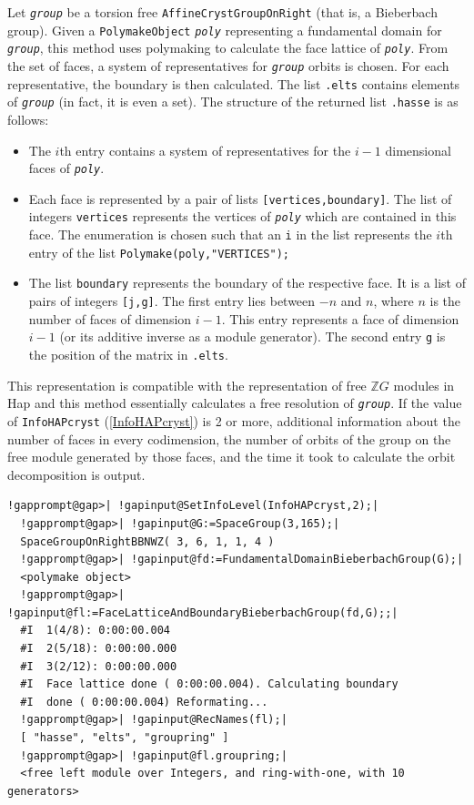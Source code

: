\documentclass[a4paper,11pt]{report}
\begin{document}
{{{ Let \mbox{\texttt{\mdseries\slshape group}} be a torsion free \texttt{AffineCrystGroupOnRight} (that is, a Bieberbach group). Given a \texttt{PolymakeObject} \mbox{\texttt{\mdseries\slshape poly}} representing a fundamental domain for \mbox{\texttt{\mdseries\slshape group}}, this method uses \textsf{polymaking} to calculate the face lattice of \mbox{\texttt{\mdseries\slshape poly}}. From the set of faces, a system of representatives for \mbox{\texttt{\mdseries\slshape group}}\texttt{} orbits is chosen. For each representative, the boundary
is then calculated. The list \texttt{.elts} contains elements of \mbox{\texttt{\mdseries\slshape group}} (in fact, it is even a set). The structure of the returned list \texttt{.hasse} is as follows: 
\begin{itemize}
\item The $i$\texttt{}th entry contains a system of representatives for the $i-1$ dimensional faces of \mbox{\texttt{\mdseries\slshape poly}}. 
\item Each face is represented by a pair of lists \texttt{[vertices,boundary]}. The list of integers \texttt{vertices} represents the vertices of \mbox{\texttt{\mdseries\slshape poly}} which are contained in this face. The enumeration is chosen such that an \texttt{i} in the list represents the $i$\texttt{}th entry of the list \texttt{Polymake(poly,"VERTICES");} 
\item  The list \texttt{boundary} represents the boundary of the respective face. It is a list of pairs of
integers \texttt{[j,g]}. The first entry lies between $-n$ and $n$, where $n$ is the number of faces of dimension $i-1$. This entry represents a face of dimension $i-1$ (or its additive inverse as a module generator). The second entry \texttt{g} is the position of the matrix in \texttt{.elts}. 
\end{itemize}
 This representation is compatible with the representation of free $\mathbb Z G$ modules in \textsf{Hap} and this method essentially calculates a free resolution of \mbox{\texttt{\mdseries\slshape group}}. If the value of \texttt{InfoHAPcryst} (\ref{InfoHAPcryst}) is 2 or more, additional information about the number of faces in every
codimension, the number of orbits of the group on the free module generated by
those faces, and the time it took to calculate the orbit decomposition is
output. }

 
\begin{Verbatim}[commandchars=!@|,fontsize=\small,frame=single,label=Example]
  !gapprompt@gap>| !gapinput@SetInfoLevel(InfoHAPcryst,2);|
  !gapprompt@gap>| !gapinput@G:=SpaceGroup(3,165);|
  SpaceGroupOnRightBBNWZ( 3, 6, 1, 1, 4 )
  !gapprompt@gap>| !gapinput@fd:=FundamentalDomainBieberbachGroup(G);|
  <polymake object>
  !gapprompt@gap>| !gapinput@fl:=FaceLatticeAndBoundaryBieberbachGroup(fd,G);;|
  #I  1(4/8): 0:00:00.004
  #I  2(5/18): 0:00:00.000
  #I  3(2/12): 0:00:00.000
  #I  Face lattice done ( 0:00:00.004). Calculating boundary
  #I  done ( 0:00:00.004) Reformating...
  !gapprompt@gap>| !gapinput@RecNames(fl);|
  [ "hasse", "elts", "groupring" ]
  !gapprompt@gap>| !gapinput@fl.groupring;|
  <free left module over Integers, and ring-with-one, with 10 generators>
\end{Verbatim}
 

}}
\end{document}
